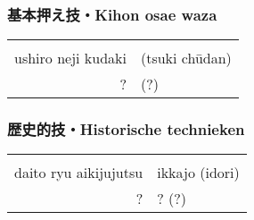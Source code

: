 \subsubsection{基本押え技・Kihon osae waza}
\begin{table}[H]
\begin{center}
\begin{tabular}{rl}
    \ruby{}{}\ruby{}{} & \\
    ushiro neji kudaki & (tsuki ch\={u}dan)\\
    ? & (?)
\end{tabular}
\end{center}
\label{kyuu_6_kihon_osae_waza}
\end{table}

\subsubsection{歴史的技・Historische technieken}
\begin{table}[H]
\begin{center}
\begin{tabular}{rl}
    \ruby{}{}\ruby{}{} & \\
    daito ryu aikijujutsu & ikkajo (idori)\\
    ? & ? (?)
\end{tabular}
\end{center}
\label{kyuu_6_historic}
\end{table}
